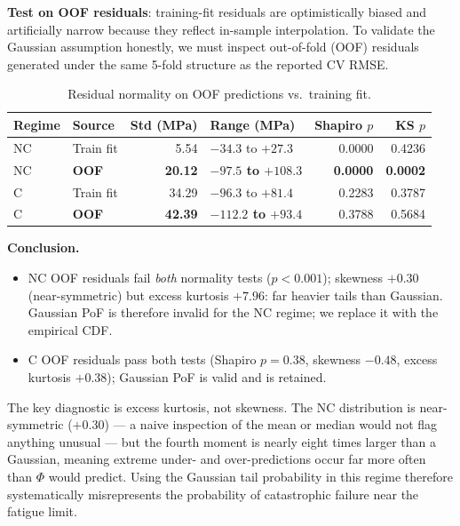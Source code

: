 \documentclass[12pt,a4paper]{article} %
\begin{document}
\textbf{Test on OOF residuals}: training-fit residuals are optimistically biased and
artificially narrow because they reflect in-sample interpolation. To validate the Gaussian
assumption honestly, we must inspect out-of-fold (OOF) residuals generated under the same
5-fold structure as the reported CV RMSE.

\begin{table}[H]
\centering
\caption{Residual normality on OOF predictions vs.\ training fit.}
\label{tab:residuals}
\setlength{\tabcolsep}{5pt}
\begin{tabular}{l l r p{3.4cm} r r}
\toprule
\textbf{Regime} & \textbf{Source} & \textbf{Std (MPa)}
                & \textbf{Range (MPa)} & \textbf{Shapiro $p$} & \textbf{KS $p$} \\
\midrule

NC & Train fit            &  5.54 & $-34.3$ to $+27.3$    & 0.0000 & 0.4236 \\
NC & \textbf{OOF}         & \textbf{20.12} & \textbf{$-97.5$ to $+108.3$}
                                                           & \textbf{0.0000} & \textbf{0.0002} \\
C  & Train fit            & 34.29 & $-96.3$ to $+81.4$    & 0.2283 & 0.3787 \\
C  & \textbf{OOF}         & \textbf{42.39} & \textbf{$-112.2$ to $+93.4$}
                                                           & 0.3788 & 0.5684 \\
\bottomrule
\end{tabular}
\end{table}

\textbf{Conclusion.}
\begin{itemize}[nosep]
  \item NC OOF residuals fail \emph{both} normality tests ($p < 0.001$); skewness $+0.30$
        (near-symmetric) but excess kurtosis $+7.96$: far heavier tails than Gaussian.
        Gaussian PoF is therefore invalid for the NC regime; we replace it with the
        empirical CDF.
  \item C OOF residuals pass both tests (Shapiro $p=0.38$, skewness $-0.48$,
        excess kurtosis $+0.38$); Gaussian PoF is valid and is retained.
\end{itemize}

The key diagnostic is excess kurtosis, not skewness. The NC distribution is
near-symmetric ($+0.30$) — a naive inspection of the mean or median would not flag
anything unusual — but the fourth moment is nearly eight times larger than a Gaussian,
meaning extreme under- and over-predictions occur far more often than $\Phi$ would
predict. Using the Gaussian tail probability in this regime therefore systematically
misrepresents the probability of catastrophic failure near the fatigue limit.
\end{document}
